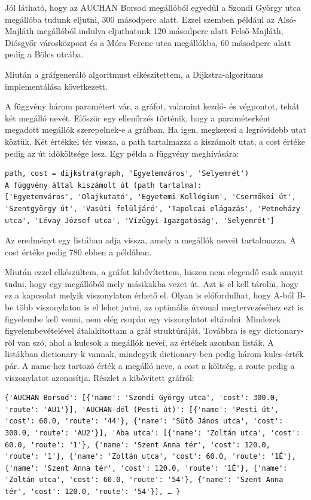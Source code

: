 Jól látható, hogy az AUCHAN Borsod megállóból egyedül a Szondi György utca megállóba tudunk eljutni, 300 másodperc alatt. Ezzel szemben például az Alsó-Majláth megállóból indulva eljuthatunk 120 másodperc alatt Felső-Majláth, Diósgyőr városközpont és a Móra Ferenc utca megállókba, 60 másodperc alatt pedig a Bölcs utcába.

Miután a gráfgeneráló algoritmust elkészítettem, a Dijkstra-algoritmus implementálása következett.

A függvény három paramétert vár, a gráfot, valamint kezdő- és végpontot, tehát két megálló nevét. Először egy ellenőrzés történik, hogy a paraméterként megadott megállók szerepelnek-e a gráfban. Ha igen, megkeresi a legrövidebb utat köztük. Két értékkel tér vissza, a path tartalmazza a kiszámolt utat, a cost értéke pedig az út időköltsége lesz.
Egy példa a függvény meghívására:

\begin{verbatim}
path, cost = dijkstra(graph, 'Egyetemváros', 'Selyemrét')
A függvény által kiszámolt út (path tartalma):
['Egyetemváros', 'Olajkutató', 'Egyetemi Kollégium', 'Csermőkei út', 'Szentgyörgy út', 'Vasúti felüljáró', 'Tapolcai elágazás', 'Petneházy utca', 'Lévay József utca', 'Vízügyi Igazgatóság', 'Selyemrét']
\end{verbatim}

Az eredményt egy listában adja vissza, amely a megállók neveit tartalmazza. A cost értéke pedig 780 ebben a példában.

Miután ezzel elkészültem, a gráfot kibővítettem, hiszen nem elegendő csak annyit tudni, hogy egy megállóból mely másikakba vezet út. Azt is el kell tárolni, hogy ez a kapcsolat melyik viszonylaton érhető el. Olyan is előfordulhat, hogy A-ból B-be több viszonylaton is el lehet jutni, az optimális útvonal megtervezéséhez ezt is figyelembe kell venni, nem elég csupán egy viszonylatot eltárolni.
Mindezek figyelembevételével átalakítottam a gráf struktúráját. Továbbra is egy dictionary-ről van szó, ahol a kulcsok a megállók nevei, az értékek azonban listák. A listákban dictionary-k vannak, mindegyik dictionary-ben pedig három kulcs-érték pár. A name-hez tartozó érték a megálló neve, a cost a költség, a route pedig a viszonylatot azonosítja.
Részlet a kibővített gráfról:

\begin{verbatim}
{'AUCHAN Borsod': [{'name': 'Szondi György utca', 'cost': 300.0, 'route': 'AU1'}], 'AUCHAN-dél (Pesti út)': [{'name': 'Pesti út', 'cost': 60.0, 'route': '44'}, {'name': 'Sütő János utca', 'cost': 300.0, 'route': 'AU2'}], 'Aba utca': [{'name': 'Zoltán utca', 'cost': 60.0, 'route': '1'}, {'name': 'Szent Anna tér', 'cost': 120.0, 'route': '1'}, {'name': 'Zoltán utca', 'cost': 60.0, 'route': '1É'}, {'name': 'Szent Anna tér', 'cost': 120.0, 'route': '1É'}, {'name': 'Zoltán utca', 'cost': 60.0, 'route': '54'}, {'name': 'Szent Anna tér', 'cost': 120.0, 'route': '54'}], … }
\end{verbatim}


